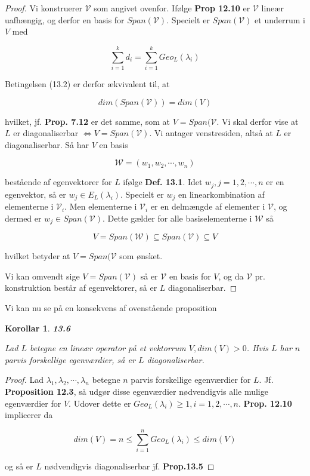 \documentclass[paper=a4, fontsize=11pt]{scrartcl} %
\newtheorem*{korollar}{Korollar}
\newenvironment{cstmkorollar}[1]{\begin{korollar} {\normalfont\textbf{#1}}}{\end{korollar}}
\begin{document}
			
			\begin{proof}
				
				Vi konstruerer $\mathcal{V}$ som angivet ovenfor. Ifølge \textbf{Prop 12.10} er $\mathcal{V}$ lineær uafhængig, og derfor en basis for $Span(\mathcal{V})$. Specielt er $Span(\mathcal{V})$ et underrum i $V$ med
				
				\[\sum_{i=1}^k d_i = \sum_{i=1}^k Geo_L(\lambda_i)\]
				
				Betingelsen (13.2) er derfor ækvivalent til, at 
				
				\[dim(Span(\mathcal{V})) = dim(V)\]
				
				hvilket, jf. \textbf{Prop. 7.12} er det samme, som at $V = Span(\mathcal{V}$. Vi skal derfor vise at $L$ er diagonaliserbar $\Leftrightarrow V = Span(\mathcal{V})$. Vi antager venstresiden, altså at $L$ er diagonaliserbar. Så har $V$ en basis
				
				\[\mathcal{W} = (w_1,w_2,\cdots,w_n)\]
				
				bestående af egenvektorer for $L$ ifølge \textbf{Def. 13.1}. Idet $w_j, j = 1,2,\cdots,n$ er en egenvektor,  så er $w_j \in E_L(\lambda_i)$. Specielt er $w_j$ en linearkombination af elementerne i $\mathcal{V}_i$. Men elementerne i $\mathcal{V}_i$ er en delmængde af elementer i $\mathcal{V}$, og dermed er $w_j \in Span(\mathcal{V})$. Dette gælder for alle basiselementerne i $\mathcal{W}$ så
				
				\[V = Span(\mathcal{W}) \subseteq Span(\mathcal{V}) \subseteq V\]
				
				hvilket betyder at $V = Span(\mathcal{V}$ som ønsket.
				
				Vi kan omvendt sige $V = Span(\mathcal{V})$ så er $\mathcal{V}$ en basis for $V$, og da $\mathcal{V}$ pr. konstruktion består af egenvektorer, så er $L$ diagonaliserbar.
				
			\end{proof}
			
			Vi kan nu se på en konsekvens af ovenstående proposition
			
			\begin{cstmkorollar}{13.6}
				
				Lad $L$ betegne en lineær operator på et vektorrum $V, dim(V) > 0$. Hvis $L$ har $n$ parvis forskellige egenværdier, så er $L$ diagonaliserbar. 
				
			\end{cstmkorollar}
			
			
			\begin{proof}
				
				Lad $\lambda_1,\lambda_2,\cdots,\lambda_n$ betegne $n$ parvis forskellige egenværdier for $L$. Jf. \textbf{Proposition 12.3}, så udgør disse egenværdier nødvendigvis alle mulige egenværdier for $V$. Udover dette er $Geo_L(\lambda_i) \geq 1, i = 1,2,\cdots,n$. \textbf{Prop. 12.10} implicerer da
				
				\[dim(V) = n \leq \sum_{i=1}^n Geo_L(\lambda_i) \leq dim(V)\]
				
				og så er $L$ nødvendigvis diagonaliserbar jf. \textbf{Prop.13.5}
				
			\end{proof}
			
\end{document}
